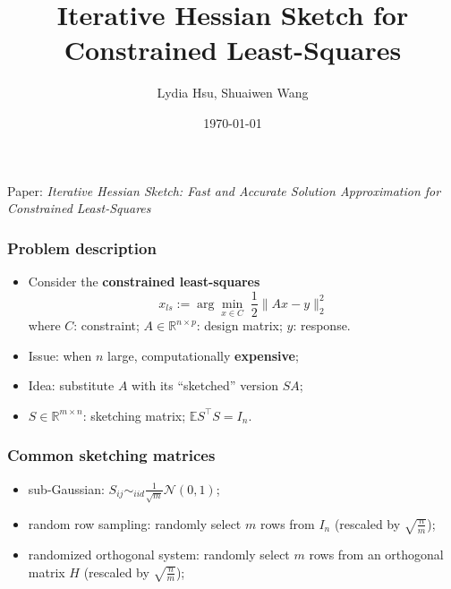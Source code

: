 \documentclass{beamer}
\title[Iterative Hessian Sketch]{Iterative Hessian Sketch for Constrained Least-Squares}
\author{Lydia Hsu, Shuaiwen Wang}
\date{\today} %
\begin{document}
\begin{frame}
    \titlepage
    
    \tiny Paper: \textit{Iterative Hessian Sketch: Fast and Accurate Solution Approximation
    for Constrained Least-Squares}
\end{frame}

\begin{frame}
    \frametitle{Problem description}

    \begin{itemize}
        \item<1-> Consider the \textbf{constrained least-squares}
            \begin{equation*}
                x_{ls} := \arg\min_{x \in C} \; \frac{1}{2} \|Ax-y\|^2_2
            \end{equation*}
            where \quad $C$: constraint; \quad $A \in \mathbb{R}^{n \times p}$: design matrix; \quad $y$: response.
        
        \item<2-> Issue: when $n$ large, computationally \textbf{expensive};
        \item<3-> Idea: substitute $A$ with its ``sketched'' version $SA$;
        \item<4-> $S \in \mathbb{R}^{m \times n}$: sketching matrix; \quad
            $\mathbb{E} S^\top S = I_n$.
    \end{itemize}
\end{frame}

\begin{frame}
    \frametitle{Common sketching matrices}

    \begin{itemize}
        \item<1-> sub-Gaussian: $S_{ij} \sim_{iid} \frac{1}{\sqrt{m}}
            \mathcal{N}(0, 1)$; 
        \item<2-> random row sampling: randomly select $m$ rows from $I_n$
            (rescaled by $\sqrt{\frac{n}{m}}$);
        \item<3-> randomized orthogonal system: randomly select $m$ rows from
            an orthogonal matrix $H$ (rescaled by $\sqrt{\frac{n}{m}}$);
    \end{itemize}
\end{frame}
\end{document}
